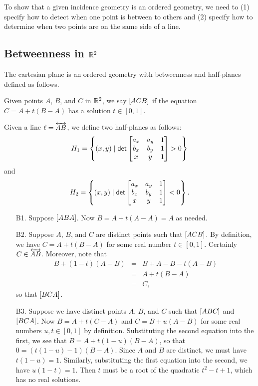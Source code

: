 To show that a given incidence geometry is an ordered geometry, we need to (1) specify how to detect when one point is between to others and (2) specify how to determine when two points are on the same side of a line.

\subsection{Betweenness in \(\mathbb{R}^2\)}

\begin{prop}
The cartesian plane is an ordered geometry with betweenness and half-planes defined as follows.
\begin{proplist}
\item Given points \(A\), \(B\), and \(C\) in \(\mathbb{R}^2\), we say \([ A C B ]\) if the equation \(C = A + t(B-A)\) has a solution \(t \in [0,1]\).
\item Given a line \(\ell = \overleftrightarrow{AB}\), we define two half-planes as follows: \[ H_1 = \left\{ (x, y) \mid \mathsf{det} \begin{bmatrix} a_x & a_y & 1 \\ b_x & b_y & 1 \\ x & y & 1 \end{bmatrix} > 0 \right\} \] and \[ H_2 = \left\{ (x, y) \mid \mathsf{det} \begin{bmatrix} a_x & a_y & 1 \\ b_x & b_y & 1 \\ x & y & 1 \end{bmatrix} < 0 \right\}. \]
\end{proplist}
\end{prop}

\begin{itemize}
\item[B1.] Suppose \([ A B A ]\).
Now \(B = A + t(A - A) = A\) as needed.
\item[B2.] Suppose \(A\), \(B\), and \(C\) are distinct points such that \([ A C B ]\). By definition, we have \(C = A + t(B-A)\) for some real number \(t \in [0,1]\). Certainly \(C \in \overleftrightarrow{AB}\). Moreover, note that
\begin{eqnarray*}
B + (1-t)(A-B) & = & B + A - B - t(A-B) \\
 & = & A + t(B-A) \\
 & = & C,
\end{eqnarray*}
so that \([ B C A ]\).
\item[B3.] Suppose we have distinct points \(A\), \(B\), and \(C\) such that \([ A B C ]\) and \([ B C A ]\).
Now \(B = A + t(C-A)\) and \(C = B + u(A-B)\) for some real numbers \(u,t \in [0,1]\) by definition.
Substituting the second equation into the first, we see that \(B = A + t(1-u)(B - A)\), so that \(0 = (t(1-u) - 1)(B - A)\). Since \(A\) and \(B\) are distinct, we must have \(t(1-u) = 1\). Similarly, substituting the first equation into the second, we have \(u(1-t) = 1\). Then \(t\) must be a root of the quadratic \(t^2 - t + 1\), which has no real solutions.
\end{itemize}

